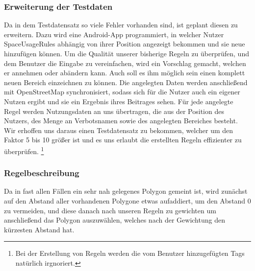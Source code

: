 \subsubsection{Erweiterung der Testdaten}
Da in dem Testdatensatz so viele Fehler vorhanden sind, ist geplant diesen zu erweitern. Dazu wird eine Android-App programmiert, in welcher Nutzer SpaceUsageRules
abhängig von ihrer Position angezeigt bekommen und sie neue hinzufügen können.
Um die Qualität unserer bisherige Regeln zu überprüfen, und dem Benutzer die Eingabe zu vereinfachen, wird ein Vorschlag gemacht,
welchen er annehmen oder abändern kann. Auch soll es ihm möglich sein einen komplett neuen Bereich einzeichnen zu können.
Die angelegten Daten werden anschließend mit OpenStreetMap synchronisiert, sodass sich für die Nutzer auch ein eigener Nutzen ergibt
und sie ein Ergebnis ihres Beitrages sehen.
Für jede angelegte Regel werden Nutzungsdaten an uns übertragen, die aus der Position des Nutzers, des Menge an Verbotsnamen sowie des angelegten Bereiches besteht.
Wir erhoffen uns daraus einen Testdatensatz zu bekommen, welcher um den Faktor 5 bis 10 größer ist und es uns erlaubt die erstellten Regeln effizienter zu überprüfen.
\footnote{Bei der Erstellung von Regeln werden die vom Benutzer hinzugefügten Tags natürlich irgnoriert.}


\subsubsection{Regelbeschreibung}
Da in fast allen Fällen ein sehr nah gelegenes Polygon gemeint ist, wird zunächst auf den Abstand aller vorhandenen Polygone etwas aufaddiert,
um den Abstand 0 zu vermeiden, und diese danach nach unseren Regeln zu gewichten um anschließend das Polygon auszuwählen,
welches nach der Gewichtung den kürzesten Abstand hat.


